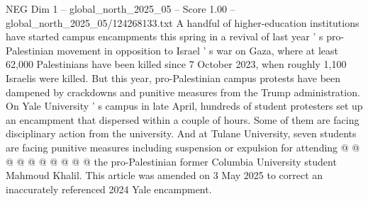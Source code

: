 \begin{textsample}{NEG Dim 1 – global\_north\_2025\_05 – Score 1.00 – global\_north\_2025\_05/124268133.txt}
A handful of higher-education institutions have started campus encampments this spring in a revival of last year ' s pro-Palestinian movement in opposition to Israel ' s war on Gaza, where at least 62,000 Palestinians have been killed since 7 October 2023, when roughly 1,100 Israelis were killed.
But this year, pro-Palestinian campus protests have been dampened by crackdowns and punitive measures from the Trump administration.
On Yale University ' s campus in late April, hundreds of student protesters set up an encampment that dispersed within a couple of hours.
Some of them are facing disciplinary action from the university.
And at Tulane University, seven students are facing punitive measures including suspension or expulsion for attending @ @ @ @ @ @ @ @ @ @ the pro-Palestinian former Columbia University student Mahmoud Khalil.
This article was amended on 3 May 2025 to correct an inaccurately referenced 2024 Yale encampment.

\end{textsample}
